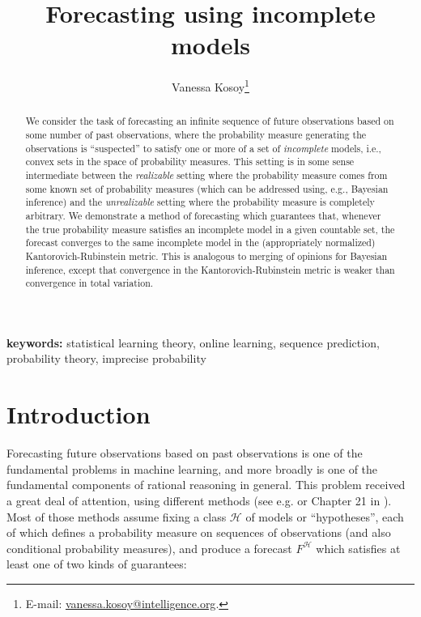 \documentclass[11pt]{article}
\theoremstyle{definition}
\theoremstyle{plain}
\newcommand{\MC}{\mathcal{H}}
\begin{document}
\title{Forecasting using incomplete models}
\author{Vanessa Kosoy\footnote{E-mail: \href{mailto:vanessa.kosoy@intelligence.org}{vanessa.kosoy@intelligence.org}.} }
\date{}%
\maketitle

\begin{abstract}
We consider the task of forecasting an infinite sequence of future observations based on some number of past observations, where the probability measure generating the observations is \enquote{suspected} to satisfy one or more of a set of \emph{incomplete} models, i.e., convex sets in the space of probability measures. This setting is in some sense intermediate between the \emph{realizable} setting where the probability measure comes from some known set of probability measures (which can be addressed using, e.g., Bayesian inference) and the \emph{unrealizable} setting where the probability measure is completely arbitrary. We demonstrate a method of forecasting which guarantees that, whenever the true probability measure satisfies an incomplete model in a given countable set, the forecast converges to the same incomplete model in the (appropriately normalized) Kantorovich-Rubinstein metric. This is analogous to merging of opinions for Bayesian inference, except that convergence in the Kantorovich-Rubinstein metric is weaker than convergence in total variation.
\end{abstract}

\textbf{keywords:} statistical learning theory, online learning, sequence prediction, probability theory, imprecise probability


\section{Introduction}

Forecasting future observations based on past observations is one of the fundamental problems in machine learning, and more broadly is one of the fundamental components of rational reasoning in general. This problem received a great deal of attention, using different methods (see e.g. \cite{Cesa-Bianchi_2006} or Chapter 21 in \cite{Shalev-Shwartz_2014}). Most of those methods assume fixing a class $\MC$ of models or \enquote{hypotheses}, each of which defines a probability measure on sequences of observations (and also conditional probability measures), and produce a forecast $F^\MC$ which satisfies at least one of two kinds of guarantees:
\end{document}
